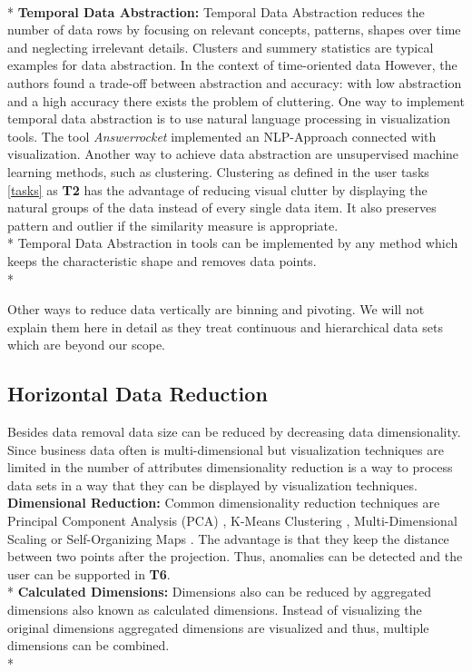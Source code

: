 \\*
\textbf{Temporal Data Abstraction: }\label{temporalabstraction}
Temporal Data Abstraction  \cite{Aigner2011} reduces the number of data rows by focusing on relevant concepts, patterns, shapes over time and neglecting irrelevant details. Clusters and summery statistics  \cite{PiringerHarald2011} are typical examples for data abstraction. In the context of time-oriented data  However, the authors found a trade-off between abstraction and accuracy: with low abstraction and a high accuracy there exists the problem of cluttering. 
One way to implement temporal data abstraction is to use natural language processing in visualization tools. The tool \textit{Answerrocket} implemented an NLP-Approach connected with visualization. Another way to achieve data abstraction are unsupervised machine learning methods, such as clustering.
Clustering as defined in the user tasks \ref{tasks} as \textbf{T2} has the advantage of reducing visual clutter by displaying the natural groups of the data instead of every single data item. It also preserves pattern and outlier if the similarity measure is appropriate.\\*
Temporal Data Abstraction in tools can be implemented by any method which keeps the characteristic shape and removes data points. \\*

Other ways to reduce data vertically are binning and pivoting. We will not explain them here in detail as they treat continuous and hierarchical data sets which are beyond our scope. 

\subsection{Horizontal Data Reduction}
Besides data removal data size can be reduced by decreasing data dimensionality. Since business data often is multi-dimensional but visualization techniques are limited in the number of attributes dimensionality reduction is a way to process data sets in a way that they can be displayed by visualization techniques. 
\textbf{Dimensional Reduction: }Common dimensionality reduction techniques are Principal Component Analysis (PCA)  \cite{Aigner2008}, K-Means Clustering  \cite{Hamilton2015}, Multi-Dimensional Scaling or  Self-Organizing Maps  \cite{PiringerHarald2011}. The advantage is that they keep the distance between two points after the projection. Thus, anomalies can be detected and the user can be supported in \textbf{T6}.\\* 
\textbf{Calculated Dimensions: }Dimensions also can be reduced by aggregated dimensions also known as calculated dimensions. Instead of visualizing the original dimensions aggregated dimensions are visualized and thus, multiple dimensions can be combined.\\*

